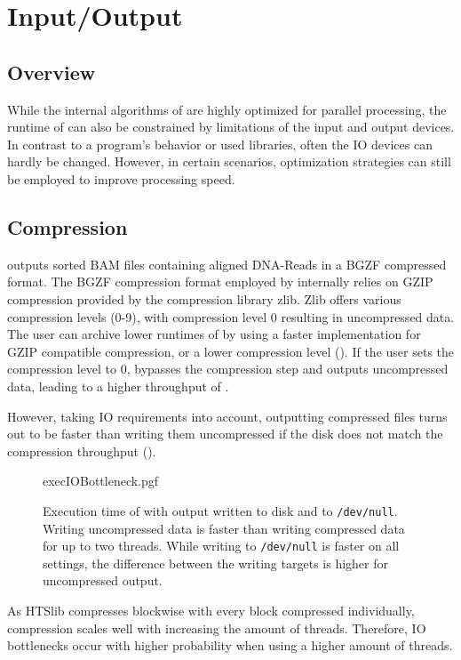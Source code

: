 \section{Input/Output} 

\subsection{Overview}
While the internal algorithms of \sort are highly optimized for parallel processing, the runtime of \sort can also be constrained by limitations of the input and output devices. 
In contrast to a program's behavior or used libraries, often the IO devices can hardly be changed. However, in certain scenarios, optimization strategies can still be employed to improve processing speed.

\subsection{Compression}\label{ioComp}
\sort outputs sorted BAM files containing aligned DNA-Reads in a BGZF compressed format. The BGZF compression format employed by \sort internally relies on GZIP compression provided by the compression library zlib. Zlib offers various compression levels (0-9), with compression level 0 resulting in uncompressed data.
The user can archive lower runtimes of \sort by using a faster implementation for GZIP compatible compression, or a lower compression level (). If the user sets the compression level to 0, \sort bypasses the compression step and outputs uncompressed data, leading to a higher throughput of \sort. 

However, taking IO requirements into account, outputting compressed files turns out to be faster than writing them uncompressed if the disk does not match the compression throughput (). 
\begin{figure}[h]
        {execIOBottleneck.pgf}
    \caption{Execution time of \sort with output written to disk and to \texttt{/dev/null}. \threads \points \\ 
    Writing uncompressed data is faster than writing compressed data for up to two threads. While writing to \texttt{/dev/null} is faster on all settings, the difference between the writing targets is higher for uncompressed output.}
    \label{fig:execIO}
\end{figure}
As HTSlib compresses blockwise with every block compressed individually, compression scales well with increasing the amount of threads. Therefore, IO bottlenecks occur with higher probability when using a higher amount of threads. 

